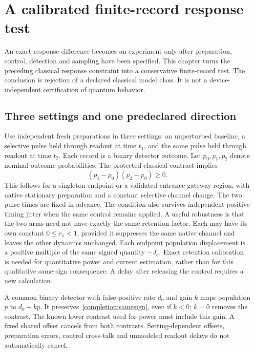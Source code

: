 \chapter{A calibrated finite-record response test}
\label{completion:statistics}

An exact response difference becomes an experiment only after preparation,
control, detection and sampling have been specified. This chapter turns the
preceding classical response constraint into a conservative finite-record test.
The conclusion is rejection of a declared classical model class. It is not a
device-independent certification of quantum behavior.

\section{Three settings and one predeclared direction}
Use independent fresh preparations in three settings: an unperturbed baseline,
a selective pulse held through readout at time $t_1$, and the same pulse held
through readout at time $t_2$. Each record is a binary detector outcome.
Let $p_0,p_1,p_2$ denote nominal outcome probabilities. The protected classical
contract implies
\begin{equation}\label{completion:samesign}
 (p_1-p_0)(p_2-p_0)\geq0.
\end{equation}
This follows for a singleton endpoint or a validated entrance-gateway region,
with native stationary preparation and a constant selective channel change.
The two pulse times are fixed in advance. The condition also survives
independent positive timing jitter when the same control remains applied.
A useful robustness is that the two arms need not have exactly the same
retention factor. Each may have its own constant $0\leq r_s<1$, provided it
suppresses the same native channel and leaves the other dynamics unchanged.
Each endpoint population displacement is a positive multiple of the same
signed quantity $-J_e$.
Exact retention calibration is needed for quantitative power and current
estimation, rather than for this qualitative same-sign consequence.
A delay after releasing the control requires a new calculation.

A common binary detector with false-positive rate $d_0$ and gain $k$ maps
population $p$ to $d_0+kp$. It preserves~\eqref{completion:samesign}, even if
$k<0$; $k=0$ removes the contrast. The known lower contrast used for power
must include this gain. A fixed shared offset cancels from both contrasts.
Setting-dependent offsets, preparation errors, control cross-talk and
unmodeled readout delays do not automatically cancel.

